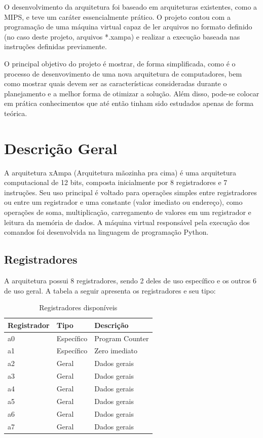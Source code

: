 \documentclass[
	12pt,				%
	oneside,			%
	a4paper,			%
	english,			%
	french,				%
	spanish,			%
	brazil				%
	]{abntex2}
\begin{document}
O desenvolvimento da arquitetura foi baseado em arquiteturas existentes, como a MIPS, e teve um caráter essencialmente prático. O projeto contou com a programação de uma máquina virtual capaz de ler arquivos no formato definido (no caso deste projeto, arquivos *.xampa) e realizar a execução baseada nas instruções definidas previamente.

O principal objetivo do projeto é mostrar, de forma simplificada, como é o processo de desenvovimento de uma nova arquitetura de computadores, bem como mostrar quais devem ser as características consideradas durante o planejamento e a melhor forma de otimizar a solução. Além disso, pode-se colocar em prática conhecimentos que até então tinham sido estudados apenas de forma teórica.


\chapter{Descrição Geral}
A arquitetura xAmpa (Arquitetura mãozinha pra cima) é uma arquitetura computacional de 12 bits, composta inicialmente por 8 registradores e 7 instruções. Seu uso principal é voltado para operações simples entre registradores ou entre um registrador e uma constante (valor imediato ou endereço), como operações de soma, multiplicação, carregamento de valores em um registrador e leitura da memória de dados. A máquina virtual responsável pela execução dos comandos foi desenvolvida na linguagem de programação Python.

\section{Registradores}

A arquitetura possui 8 registradores, sendo 2 deles de uso específico e os outros 6 de uso geral. A tabela a seguir apresenta os registradores e seu tipo:\\

\begin{table}[htb]
\center
\footnotesize
\begin{tabular}{|p{3cm}|p{3cm}|p{3cm}|}
  \hline
   \textbf{Registrador} & \textbf{Tipo}  & \textbf{Descrição} \\
    \hline
    a0 & Específico & Program Counter\\
    \hline
    a1 & Específico & Zero imediato\\
    \hline
    a2 & Geral & Dados gerais\\
    \hline
    a3 & Geral & Dados gerais\\
    \hline
    a4 & Geral & Dados gerais\\
    \hline
    a5 & Geral & Dados gerais\\
    \hline
    a6 & Geral & Dados gerais\\
    \hline
    a7 & Geral & Dados gerais\\
    \hline
\end{tabular}
\caption{Registradores disponíveis}
\label{table1:sample}
\end{table}
\end{document}
